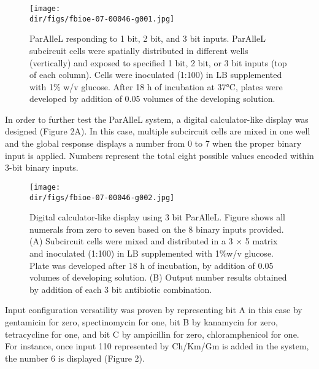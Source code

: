 \begin{figure}[htbp]
  \centering
  \texttt{[image: \\dir/figs/fbioe-07-00046-g001.jpg]}
  \caption{ParAlleL responding to 1 bit, 2 bit, and 3 bit inputs. ParAlleL subcircuit cells were spatially distributed in different wells (vertically) and exposed to specified 1 bit, 2 bit, or 3 bit inputs (top of each column). Cells were inoculated (1:100) in LB supplemented with 1\% w/v glucose. After 18 h of incubation at 37°C, plates were developed by addition of 0.05 volumes of the developing solution.}
  \label{fig.example}
\end{figure}
In order to further test the ParAlleL system, a digital calculator-like display was designed (Figure 2A). In this case, multiple subcircuit cells are mixed in one well and the global response displays a number from 0 to 7 when the proper binary input is applied. Numbers represent the total eight possible values encoded within 3-bit binary inputs.
\begin{figure}[htbp]
  \centering
  \texttt{[image: \\dir/figs/fbioe-07-00046-g002.jpg]}
  \caption{Digital calculator-like display using 3 bit ParAlleL. Figure shows all numerals from zero to seven based on the 8 binary inputs provided. (A) Subcircuit cells were mixed and distributed in a 3 × 5 matrix and inoculated (1:100) in LB supplemented with 1\%w/v glucose. Plate was developed after 18 h of incubation, by addition of 0.05 volumes of developing solution. (B) Output number results obtained by addition of each 3 bit antibiotic combination.}
  \label{fig.example}
\end{figure}
Input configuration versatility was proven by representing bit A in this case by gentamicin for zero, spectinomycin for one, bit B by kanamycin for zero, tetracycline for one, and bit C by ampicillin for zero, chloramphenicol for one. For instance, once input 110 represented by Ch/Km/Gm is added in the system, the number 6 is displayed (Figure 2).


